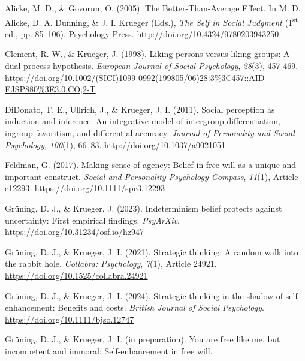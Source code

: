 \documentclass[authordate, anecdote]{jote-new-article}
\begin{document}
	Alicke, M. D., \& Govorun, O. (2005). The Better-Than-Average Effect. In M. D. Alicke, D. A. Dunning, \& J. I. Krueger (Eds.), \emph{The Self in Social Judgment} (1\textsuperscript{st} ed., pp. 85--106). Psychology Press. \href{http://doi.org/10.4324/9780203943250}{http://doi.org/10.4324/9780203943250}



	Clement, R. W., \& Krueger, J. (1998). Liking persons versus liking groups: A dual-process hypothesis. \emph{European Journal of Social Psychology},\emph{ 28}(3), 457-469. \href{https://doi.org/10.1002/(SICI)1099-0992(199805/06)28:3\%3C457::AID-EJSP880\%3E3.0.CO;2-T}{https://doi.org/10.1002/(SICI)1099-0992(199805/06)28:3\%3C457::AID-EJSP880\%3E3.0.CO;2-T}



	DiDonato, T. E., Ullrich, J., \& Krueger, J. I. (2011). Social perception as induction and inference: An integrative model of intergroup differentiation, ingroup favoritism, and differential accuracy. \emph{Journal of Personality and Social Psychology}, \emph{100}(1), 66--83. \href{http://doi.org/10.1037/a0021051}{http://doi.org/10.1037/a0021051}



	Feldman, G. (2017). Making sense of agency: Belief in free will as a unique and important construct. \emph{Social and Personality Psychology Compass}, \emph{11}(1), Article e12293. \href{https://doi.org/10.1111/spc3.12293}{https://doi.org/10.1111/spc3.12293}



	Grüning, D. J., \& Krueger, J. (2023). Indeterminism belief protects against uncertainty: First empirical findings. \emph{PsyArXiv}. \href{https://doi.org/10.31234/osf.io/hz947}{https://doi.org/10.31234/osf.io/hz947}



	Grüning, D. J., \& Krueger, J. I. (2021). Strategic thinking: A random walk into the rabbit hole. \emph{Collabra: Psychology}, \emph{7}(1), Article 24921. \href{https://doi.org/10.1525/collabra.24921}{https://doi.org/10.1525/collabra.24921}



	Grüning, D. J., \& Krueger, J. I. (2024). Strategic thinking in the shadow of self-enhancement: Benefits and costs. \emph{British Journal of Social Psychology}. \href{https://doi.org/10.1111/bjso.12747}{https://doi.org/10.1111/bjso.12747}



	Grüning, D. J., \& Krueger, J. I. (in preparation). You are free like me, but incompetent and immoral: Self-enhancement in free will.
\end{document}
